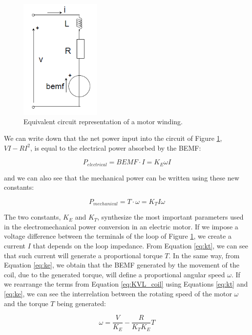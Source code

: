 \begin{figure}[htbp]
\centering
\includegraphics[width=4cm]{Images/eq_motor.png} 
\caption[DC Motor Electrical Model]{Equivalent circuit representation of a motor winding.}
\label{fig:eq_motor}
\end{figure}

We can write down that the net power input into the circuit of Figure \ref{fig:eq_motor}, $VI-RI^{2}$, is equal to the electrical power absorbed by the \ac{BEMF}:

\begin{equation}
	\label{eq:p_elec_2}
	P_{electrical} = BEMF \cdot I = K_{E} \omega I
\end{equation}

and we can also see that the mechanical power can be written using these new constants:

\begin{equation}
	\label{eq:p_mech_2}
	P_{mechanical} = T \cdot \omega = K_{T} I \omega
\end{equation}

The two constants, $K_{E}$ and $K_{T}$, synthesize the most important parameters used in the electromechanical power conversion in an electric motor. If we impose a voltage difference between the terminals of the loop of Figure \ref{fig:eq_motor}, we create a current $I$ that depends on the loop impedance. From Equation \ref{eq:kt}, we can see that such current will generate a proportional torque $T$. In the same way, from Equation \ref{eq:ke}, we obtain that the \ac{BEMF} generated by the movement of the coil, due to the generated torque, will define a proportional angular speed $\omega$. If we rearrange the terms from Equation \ref{eq:KVL_coil} using Equations \ref{eq:kt} and \ref{eq:ke}, we can see the interrelation between the rotating speed of the motor $\omega$ and the torque $T$ being generated:

\begin{equation}
	\label{eq:speed_1}
	\omega = \frac{V}{K_{E}} - \frac{R}{K_{T}K_{E}}T
\end{equation}

